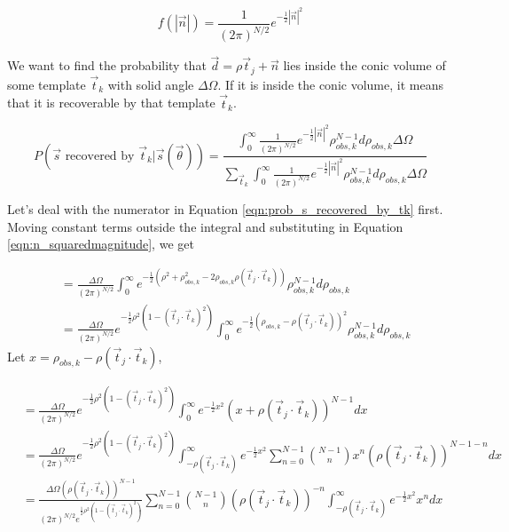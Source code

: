 \documentclass[12pt]{article}
\newcommand{\ptjtk}{\rho(\vec{t}_j\cdot\vec{t}_k)}
\begin{document}
   \begin{equation}
   f(|\vec{n}|) = \frac{1}{(2\pi)^{N/2}}e^{-\frac{1}{2}|\vec{n}|^2}
   \end{equation}

We want to find the probability that $\vec{d}=\rho\vec{t}_j+\vec{n}$ lies inside the conic volume of some template $\vec{t}_k$ with solid angle $\Delta\Omega$. If it is inside the conic volume, it means that it is recoverable by that template $\vec{t}_k$.

   \begin{equation}
   P(\text{$\vec{s}$ recovered by $\vec{t}_k$}|\vec{s}(\vec\theta)) = \frac{\int_0^\infty \frac{1}{(2\pi)^{N/2}} e^{-\frac{1}{2} |\vec{n}|^2} {\rho^{N-1}_{obs,k}} d\rho_{obs,k} \Delta\Omega}
   {\sum_{\vec{t}_k} \int_0^\infty \frac{1}{(2\pi)^{N/2}} e^{-\frac{1}{2} |\vec{n}|^2} {\rho^{N-1}_{obs,k}} d\rho_{obs,k} \Delta\Omega}
   \label{eqn:prob_s_recovered_by_tk}
   \end{equation}

Let's deal with the numerator in Equation \ref{eqn:prob_s_recovered_by_tk} first. Moving constant terms outside the integral and substituting in Equation \ref{eqn:n_squaredmagnitude}, we get

   \begin{align}
   &= \frac{\Delta\Omega}{(2\pi)^{N/2}} \int_0^\infty  e^{-\frac{1}{2}( \rho^2 + \rho_{obs,k}^2 - 2\rho_{obs,k}\ptjtk)  } {\rho^{N-1}_{obs,k}} d\rho_{obs,k} \\
  &= \frac{\Delta\Omega}{(2\pi)^{N/2}} e^{-\frac{1}{2}\rho^2(1-(\vec{t}_j\cdot\vec{t}_k)^2)} \int_0^\infty  e^{-\frac{1}{2} (\rho_{obs,k} - \ptjtk)^2  } {\rho^{N-1}_{obs,k}} d\rho_{obs,k}
   \end{align}
Let $x = \rho_{obs,k} - \ptjtk$,

   \begin{align}
   &= \frac{\Delta\Omega}{(2\pi)^{N/2}} e^{-\frac{1}{2}\rho^2(1-(\vec{t}_j\cdot\vec{t}_k)^2)} \int_0^\infty  e^{-\frac{1}{2} x^2  } {(x+\ptjtk)^{N-1}} dx \\
   &= \frac{\Delta\Omega}{(2\pi)^{N/2}} e^{-\frac{1}{2}\rho^2(1-(\vec{t}_j\cdot\vec{t}_k)^2)} \int_{-\ptjtk}^\infty  e^{-\frac{1}{2} x^2  } {\sum_{n=0}^{N-1} \binom{N-1}{n}x^n(\ptjtk)^{N-1-n} } dx \\
   &= \frac{\Delta\Omega(\ptjtk)^{N-1}}{(2\pi)^{N/2}  e^{\frac{1}{2}\rho^2(1-(\vec{t}_j\cdot\vec{t}_k)^2)}}  \sum_{n=0}^{N-1} \binom{N-1}{n} (\ptjtk)^{-n} \int_{-\ptjtk}^\infty e^{-\frac{1}{2} x^2  } x^n  dx
   \end{align}
\end{document}
